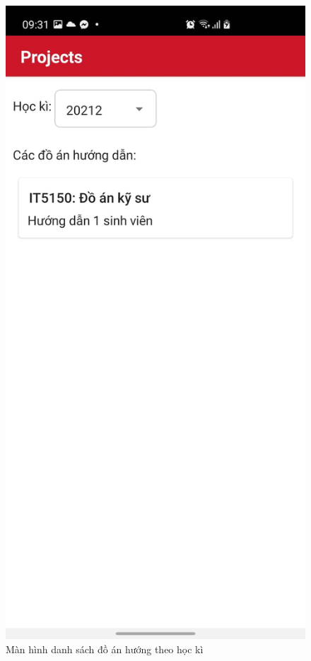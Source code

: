 \documentclass[../Main.tex]{subfiles}
\begin{document}
\begin{figure}[H]
\begin{minipage}{0.5\textwidth}
\includegraphics[width=0.60\linewidth]{Figure/screen/project_semester.jpeg}
\caption{Màn hình danh sách đồ án hướng theo học kì} \label{fig:list_task}
\end{minipage}
\end{figure}
\newpage
\noindent %
\end{document}
